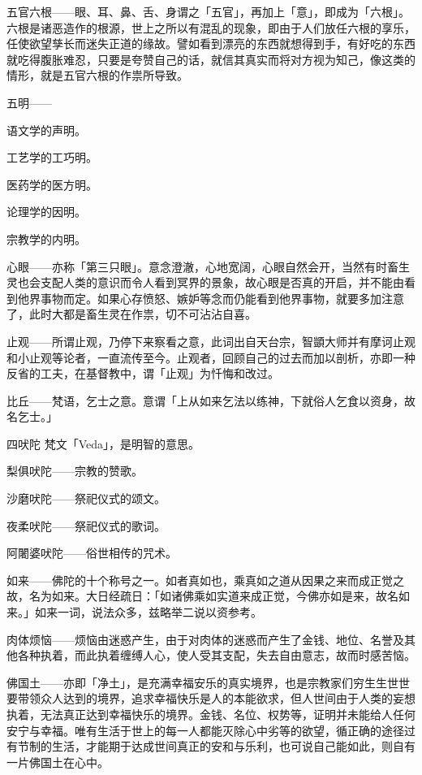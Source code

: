 \documentclass[twoside,openany]{book}
\begin{document}
\textbullet 五官六根——眼、耳、鼻、舌、身谓之「五官」，再加上「意」，即成为「六根」。六根是诸恶造作的根源，世上之所以有混乱的现象，即由于人们放任六根的享乐，任使欲望孳长而迷失正道的缘故。譬如看到漂亮的东西就想得到手，有好吃的东西就吃得腹胀难忍，只要是夸赞自己的话，就信其真实而将对方视为知己，像这类的情形，就是五官六根的作祟所导致。

\textbullet 五明——

\textperiodcentered 语文学的声明。

\textperiodcentered 工艺学的工巧明。

\textperiodcentered 医药学的医方明。

\textperiodcentered 论理学的因明。

\textperiodcentered 宗教学的内明。

\textbullet 心眼——亦称「第三只眼」。意念澄澈，心地宽阔，心眼自然会开，当然有时畜生灵也会支配人类的意识而令人看到冥界的景象，故心眼是否真的开启，并不能由看到他界事物而定。如果心存愤怒、嫉妒等念而仍能看到他界事物，就要多加注意了，此时大都是畜生灵在作祟，切不可沾沾自喜。

\textbullet 止观——所谓止观，乃停下来察看之意，此词出自天台宗，智顗大师并有摩诃止观和小止观等论者，一直流传至今。止观者，回顾自己的过去而加以剖析，亦即一种反省的工夫，在基督教中，谓「止观」为忏悔和改过。

\textbullet 比丘——梵语，乞士之意。意谓「上从如来乞法以练神，下就俗人乞食以资身，故名乞士。」

\textbullet 四吠陀	梵文「Veda」，是明智的意思。

\textperiodcentered 梨俱吠陀——宗教的赞歌。

\textperiodcentered 沙磨吠陀——祭祀仪式的颂文。

\textperiodcentered 夜柔吠陀——祭祀仪式的歌词。

\textperiodcentered 阿闍婆吠陀——俗世相传的咒术。

\textbullet 如来——佛陀的十个称号之一。如者真如也，乘真如之道从因果之来而成正觉之故，名为如来。大日经疏日：「如诸佛乘如实道来成正觉，今佛亦如是来，故名如来。」如来一词，说法众多，兹略举二说以资参考。

\textbullet 肉体烦恼——烦恼由迷惑产生，由于对肉体的迷惑而产生了金钱、地位、名誉及其他各种执着，而此执着缠缚人心，使人受其支配，失去自由意志，故而时感苦恼。

\textbullet 佛国土——亦即「净土」，是充满幸福安乐的真实境界，也是宗教家们穷生生世世要带领众人达到的境界，追求幸福快乐是人的本能欲求，但人世间由于人类的妄想执着，无法真正达到幸福快乐的境界。金钱、名位、权势等，证明并未能给人任何安宁与幸福。唯有生活于世上的每一人都能灭除心中劣等的欲望，循正确的途径过有节制的生活，才能期于达成世间真正的安和与乐利，也可说自己能如此，则自有一片佛国土在心中。
\end{document}

